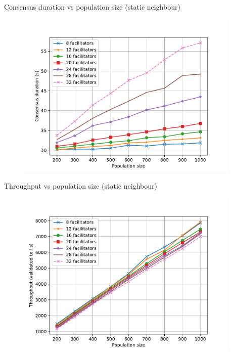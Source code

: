 \documentclass{beamer}
\begin{document}
\begin{frame}{Consensus duration vs population size (static neighbour)}
  \begin{figure}[h]
  \includegraphics[width=0.95\textwidth]{result-normal-cons-vs-pop}
  \centering
  \end{figure}
\end{frame}

\begin{frame}{Throughput vs population size (static neighbour)}
  \begin{figure}[h]
  \includegraphics[width=0.95\textwidth]{result-normal-throughput-vs-pop}
  \centering
  \end{figure}
\end{frame}
\end{document}
